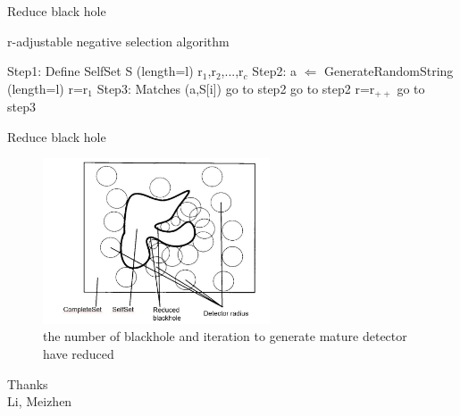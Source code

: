 \begin{frame}{Reduce black hole}
   \begin{algorithm}[H]
   \caption{r-adjustable negative selection algorithm}          
    \begin{algorithmic}  
       \STATE Step1: Define SelfSet S (length=l) r$_1$,r$_2$,...,r$_c$
       \STATE Step2: a $\Leftarrow$ GenerateRandomString (length=l) r=r$_1$
       \STATE Step3: Matches (a,S[i])
       \STATE go to step2
       \STATE go to step2
       \ELSE
       \STATE r=r$_{++}$ 
       \STATE go to step3
       \ENDIF 
       
    \end{algorithmic}
  \end{algorithm} 
\end{frame}

\begin{frame}{Reduce black hole}
  \begin{figure}[hb]
  \centering
  \includegraphics[width=0.6\textwidth]{img/reducedblackhole.jpg}
  \caption{the number of blackhole and iteration to generate mature detector have reduced}
  \end{figure}
\end{frame}

\begin{frame}
\begin{center}
\begin{spacing}{2.0}
 \Huge {Thanks}
 \large {\\Li, Meizhen}
\end{spacing}
\end{center}
\end{frame}
